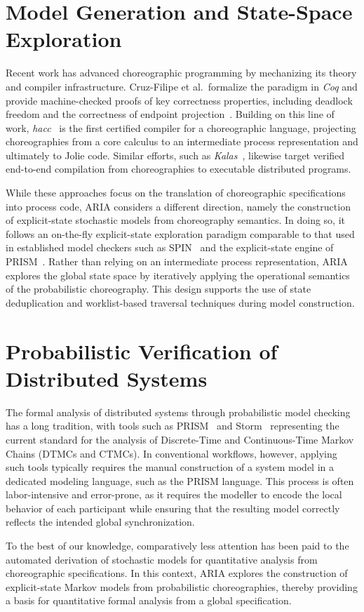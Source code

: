 \section{Model Generation and State-Space Exploration}

Recent work has advanced choreographic programming by mechanizing its theory and compiler infrastructure. Cruz-Filipe et al.\ formalize the paradigm in \textit{Coq} and provide machine-checked proofs of key correctness properties, including deadlock freedom and the correctness of endpoint projection~\cite{cruzfilipe2021}. Building on this line of work, \textit{hacc}~\cite{cruzfilipe2023hacc} is the first certified compiler for a choreographic language, projecting choreographies from a core calculus to an intermediate process representation and ultimately to Jolie code. Similar efforts, such as \textit{Kalas}~\cite{pohjola_et_al2022}, likewise target verified end-to-end compilation from choreographies to executable distributed programs.

While these approaches focus on the translation of choreographic specifications into process code, \textsc{ARIA} considers a different direction, namely the construction of explicit-state stochastic models from choreography semantics. In doing so, it follows an on-the-fly explicit-state exploration paradigm comparable to that used in established model checkers such as SPIN~\cite{Holzmann03} and the explicit-state engine of PRISM~\cite{Prism}. Rather than relying on an intermediate process representation, \textsc{ARIA} explores the global state space by iteratively applying the operational semantics of the probabilistic choreography. This design supports the use of state deduplication and worklist-based traversal techniques during model construction.

\section{Probabilistic Verification of Distributed Systems}

The formal analysis of distributed systems through probabilistic model checking has a long tradition, with tools such as PRISM~\cite{Prism} and Storm~\cite{Storm} representing the current standard for the analysis of Discrete-Time and Continuous-Time Markov Chains (DTMCs and CTMCs). In conventional workflows, however, applying such tools typically requires the manual construction of a system model in a dedicated modeling language, such as the PRISM language. This process is often labor-intensive and error-prone, as it requires the modeller to encode the local behavior of each participant while ensuring that the resulting model correctly reflects the intended global synchronization.

To the best of our knowledge, comparatively less attention has been paid to the automated derivation of stochastic models for quantitative analysis from choreographic specifications. In this context, \textsc{ARIA} explores the construction of explicit-state Markov models from probabilistic choreographies, thereby providing a basis for quantitative formal analysis from a global specification.


